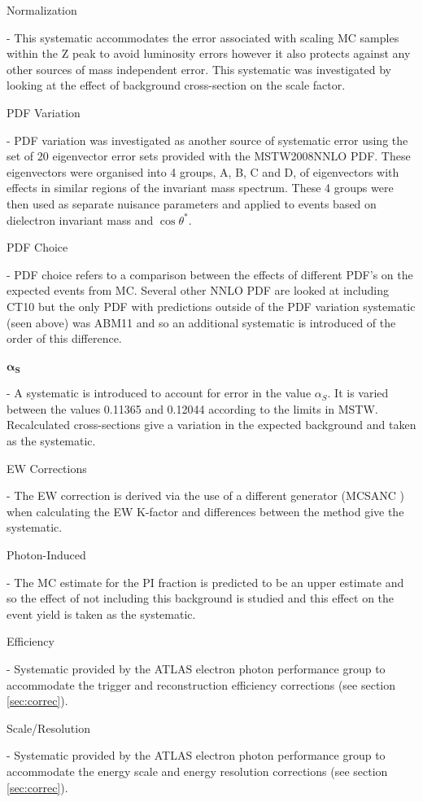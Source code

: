     {\bf\raggedright Normalization} - This systematic accommodates the error associated with scaling MC samples within the Z peak to avoid luminosity errors however it also protects against any other sources of mass independent error. This systematic was investigated by looking at the effect of background cross-section on the scale factor. \\
    {\bf\raggedright PDF Variation} - PDF variation was investigated as another source of systematic error using the set of 20 eigenvector error sets provided with the MSTW2008NNLO PDF. These eigenvectors were organised into 4 groups, A, B, C and D, of eigenvectors with effects in similar regions of the invariant mass spectrum. These 4 groups were then used as separate nuisance parameters and applied to events based on dielectron invariant mass and $\cos{\theta^{*}}$. \\ 
    {\bf\raggedright PDF Choice} - PDF choice refers to a comparison between the effects of different PDF's on the expected events from MC. Several other NNLO PDF are looked at including CT10 but the only PDF with predictions outside of the PDF variation systematic (seen above) was ABM11 \cite{Alekhin:2013dmy} and so an additional systematic is introduced of the order of this difference. \\
    {\bf\raggedright $\boldsymbol{\alpha_{S}}$} - A systematic is introduced to account for error in the value $\alpha_{S}$. It is varied between the values 0.11365 and 0.12044 according to the limits in MSTW. Recalculated cross-sections give a variation in the expected background and taken as the systematic. \\
    {\bf\raggedright EW Corrections} - The EW correction is derived via the use of a different generator (MCSANC \cite{Bondarenko:2013nu}) when calculating the EW K-factor and differences between the method give the systematic. \\
    {\bf\raggedright Photon-Induced} - The MC estimate for the PI fraction is predicted to be an upper estimate and so the effect of not including this background is studied and this effect on the event yield is taken as the systematic. \\
    {\bf\raggedright Efficiency} - Systematic provided by the ATLAS electron photon performance group to accommodate the trigger and reconstruction efficiency corrections (see section \ref{sec:correc}). \\
    {\bf\raggedright Scale/Resolution} - Systematic provided by the ATLAS electron photon performance group to accommodate the energy scale and energy resolution corrections (see section \ref{sec:correc}). \\
